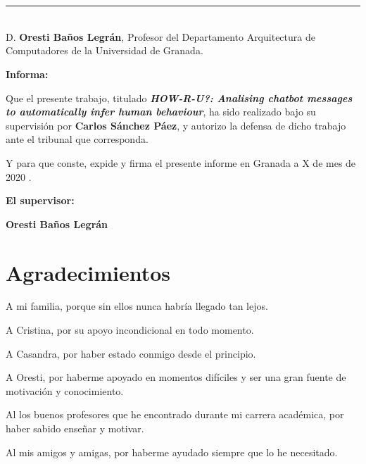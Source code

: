 \section*{}
\thispagestyle{empty}

\noindent\rule[-1ex]{\textwidth}{2pt}\\[4.5ex]

D. \textbf{Oresti Baños Legrán}, Profesor del Departamento Arquitectura de Computadores de la Universidad de Granada.



\vspace{0.5cm}

\textbf{Informa:}

\vspace{0.5cm}

Que el presente trabajo, titulado \textit{\textbf{HOW-R-U?: Analising chatbot messages to automatically infer human behaviour}},
ha sido realizado bajo su supervisión por \textbf{Carlos Sánchez Páez}, y autorizo la defensa de dicho trabajo ante el tribunal
que corresponda.

\vspace{0.5cm}

Y para que conste, expide y firma el presente informe en Granada a X de mes de 2020 .

\vspace{1cm}

\textbf{El supervisor:}

\vspace{5cm}
\begin{center}
\textbf{Oresti Baños Legrán}

\end{center}


\newpage

\section*{Agradecimientos}
\thispagestyle{empty}

       \vspace{1cm}

A mi familia, porque sin ellos nunca habría llegado tan lejos.

A Cristina, por su apoyo incondicional en todo momento.

A Casandra, por haber estado conmigo desde el principio.

A Oresti, por haberme apoyado en momentos difíciles y ser una gran fuente de motivación y conocimiento.

Al los buenos profesores que he encontrado durante mi carrera académica, por haber sabido enseñar y motivar.

Al mis amigos y amigas, por haberme ayudado siempre que lo he necesitado.
